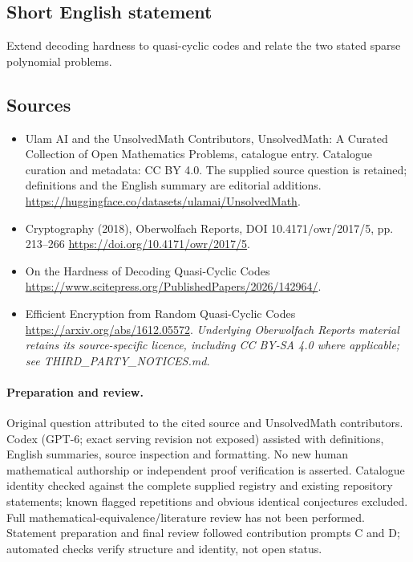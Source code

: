\documentclass[11pt]{article}
\begin{document}
\subsection{Short English statement}
Extend decoding hardness to quasi-cyclic codes and relate the two stated sparse polynomial problems.
\subsection{Sources}
\begin{itemize}
\item[\hypertarget{source:statement:1}{S1}] Ulam AI and the UnsolvedMath Contributors, UnsolvedMath: A Curated Collection of Open Mathematics Problems, catalogue entry. Catalogue curation and metadata: CC BY 4.0. The supplied source question is retained; definitions and the English summary are editorial additions.
\url{https://huggingface.co/datasets/ulamai/UnsolvedMath}.
\item[\hypertarget{source:statement:2}{S2}] Cryptography (2018), Oberwolfach Reports, DOI 10.4171/owr/2017/5, pp. 213--266
\url{https://doi.org/10.4171/owr/2017/5}.
\item[\hypertarget{source:statement:3}{S3}] On the Hardness of Decoding Quasi-Cyclic Codes
\url{https://www.scitepress.org/PublishedPapers/2026/142964/}.
\item[\hypertarget{source:statement:4}{S4}] Efficient Encryption from Random Quasi-Cyclic Codes
\url{https://arxiv.org/abs/1612.05572}.
\textit{Underlying Oberwolfach Reports material retains its source-specific licence, including CC BY-SA 4.0 where applicable; see THIRD\_PARTY\_NOTICES.md.}
\end{itemize}
\paragraph{Preparation and review.}
Original question attributed to the cited source and UnsolvedMath contributors. Codex (GPT-6; exact serving revision not exposed) assisted with definitions, English summaries, source inspection and formatting. No new human mathematical authorship or independent proof verification is asserted. Catalogue identity checked against the complete supplied registry and existing repository statements; known flagged repetitions and obvious identical conjectures excluded. Full mathematical-equivalence/literature review has not been performed. Statement preparation and final review followed contribution prompts C and D; automated checks verify structure and identity, not open status.
\label{end:statement}
\end{document}
